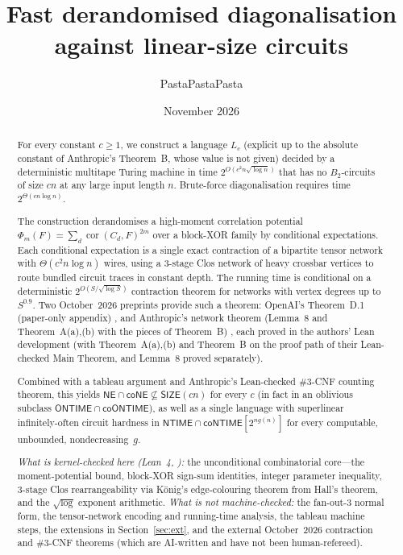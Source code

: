 \documentclass[11pt]{article}
\title{Fast derandomised diagonalisation against linear-size circuits}
\author{PastaPastaPasta}
\date{November 2026}
\theoremstyle{definition}
\newcommand{\NTIME}{\mathsf{NTIME}}
\newcommand{\ONTIME}{\mathsf{ONTIME}}
\newcommand{\SIZE}{\mathsf{SIZE}}
\newcommand{\NE}{\mathsf{NE}}
\newcommand{\coNE}{\mathsf{coNE}}
\newcommand{\leanus}{\textunderscore\allowbreak}
\newcommand{\lean}[1]{\ifmmode\text{\ttfamily #1}\else{\ttfamily\let\_\leanus #1}\fi}
\begin{document}
\maketitle

\begin{abstract}
For every constant $c\ge1$, we construct a language $L_c$ (explicit up to the absolute constant of Anthropic's Theorem~B, whose value is not given) decided by a deterministic multitape Turing machine in time $2^{O(c^2 n\sqrt{\log n})}$ that has no $B_2$-circuits of size $cn$ at any large input length $n$. Brute-force diagonalisation requires time $2^{\Theta(cn\log n)}$.

The construction derandomises a high-moment correlation potential $\Phi_m(F)=\sum_d \operatorname{cor}(C_d,F)^{2m}$ over a block-XOR family by conditional expectations. Each conditional expectation is a single exact contraction of a bipartite tensor network with $\Theta(c^2 n\log n)$ wires, using a 3-stage Clos network of heavy crossbar vertices to route bundled circuit traces in constant depth. The running time is conditional on a deterministic $2^{O(S/\sqrt{\log S})}$ contraction theorem for networks with vertex degrees up to $S^{0.9}$. Two October~2026 preprints provide such a theorem: OpenAI's Theorem~D.1 (paper-only appendix) \cite{OAI26}, and Anthropic's network theorem (Lemma~8 and Theorem~A(a),(b) with the pieces of Theorem~B) \cite{Ant26}, each proved in the authors' Lean development (with Theorem~A(a),(b) and Theorem~B on the proof path of their Lean-checked Main Theorem, and Lemma~8 proved separately).

Combined with a tableau argument and Anthropic's Lean-checked $\#3$-CNF counting theorem, this yields $\NE\cap\coNE\not\subseteq\SIZE(cn)$ for every $c$ (in fact in an oblivious subclass $\ONTIME\cap\mathsf{coONTIME}$), as well as a single language with superlinear infinitely-often circuit hardness in $\NTIME\cap\mathsf{coNTIME}[2^{n g(n)}]$ for every computable, unbounded, nondecreasing~$g$.

\emph{What is kernel-checked here (Lean~4, \lean{PastaMath/FastDiag/}):} the unconditional combinatorial core---the moment-potential bound, block-XOR sign-sum identities, integer parameter inequality, 3-stage Clos rearrangeability via K\"onig's edge-colouring theorem from Hall's theorem, and the $\sqrt{\log}$ exponent arithmetic.
\emph{What is not machine-checked:} the fan-out-3 normal form, the tensor-network encoding and running-time analysis, the tableau machine steps, the extensions in Section~\ref{sec:ext}, and the external October~2026 contraction and $\#3$-CNF theorems (which are AI-written and have not been human-refereed).
\end{abstract}
\end{document}
